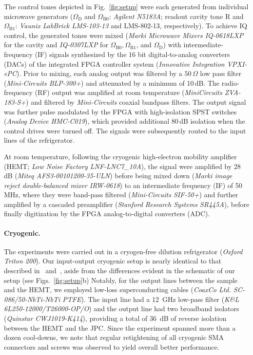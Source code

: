 The control tones depicted in Fig.~\ref{fig:setup} were each generated
from individual microwave generators ($\Omega_{\mathrm{D}}$ and $\Omega_{\mathrm{B0}}$:
\textit{Agilent N5183A}; readout cavity tone R and $\Omega_{\mathrm{B1}}$:
\textit{Vaunix LabBrick LMS-103-13} and LMS-802-13, respectively).
To achieve IQ control, the generated tones were mixed (\textit{Marki
Microwave Mixers IQ-0618LXP} for the cavity and \textit{IQ-0307LXP}
for $\Omega_{\mathrm{B0}},\Omega_{\mathrm{B1}}$, and $\Omega_{\mathrm{D}}$)
with intermediate-frequency (IF) signals synthesized by the 16 bit
digital-to-analog converters (DACs) of the integrated FPGA controller
system (\textit{Innovative Integration VPXI-ePC}). Prior to mixing,
each analog output was filtered by a $50\,\Omega$ low pass filter
(\textit{Mini-Circuits BLP-300+}) and attenuated by a minimum of 10\,dB.
The radio-frequency (RF) output was amplified at room temperature
(\textit{MiniCircuits ZVA-183-S+}) and filtered by \textit{Mini-Circuits}
coaxial bandpass filters. The output signal was further pulse modulated
by the FPGA with high-isolation SPST switches (\textit{Analog Device
HMC-C019}), which provided additional 80\,dB isolation when the control
drives were turned off. The signals were subsequently routed to the
input lines of the refrigerator. 

At room temperature, following the cryogenic high-electron mobility
amplifier (HEMT; \textit{Low Noise Factory LNF-LNC7\_10A}), the signal
were amplified by 28\,dB (\textit{Miteq AFS3-00101200-35-ULN}) before
being mixed down (\textit{Marki image reject double-balanced mixer
IRW-0618}) to an intermediate frequency (IF) of 50\,MHz, where they
were band-pass filtered (\textit{Mini-Circuits SIF-50+}) and further
amplified by a cascaded preamplifier (\textit{Stanford Research Systems
SR445A}), before finally digitization by the FPGA analog-to-digital
converters (ADC).


\paragraph{Cryogenic.}

The experiments were carried out in a cryogen-free dilution refrigerator
(\textit{Oxford Triton 200}). Our input-output cryogenic setup is
nearly identical to that described in~\citet{Ofek2016} and~\citet{Minev2016},
aside from the differences evident in the schematic of our setup (see
Figs.~\ref{fig:setup}b) Notably, for the output lines between the
sample and the HEMT, we employed low-loss superconducting cables (\emph{CoaxCo
Ltd. SC-086/50-NbTi-NbTi PTFE}). The input line had a 12~GHz low-pass
filter (\emph{K\&L 6L250-12000/T26000-OP/O}) and the output line had
two broadband isolators (\emph{Quinstar CWJ1019-K414}), providing
a total of 36~dB of reverse isolation between the HEMT and the JPC.
Since the experiment spanned more than a dozen cool-downs, we note
that regular retightening of all cryogenic SMA connectors and screws
was observed to yield overall better performance. 

